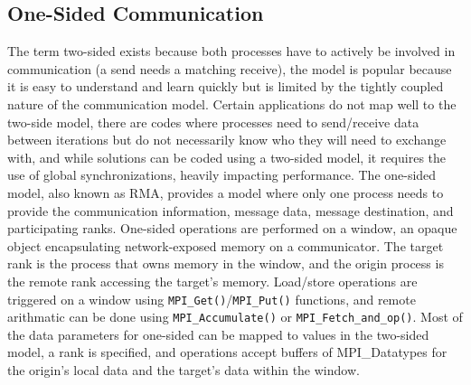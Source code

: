 \subsection{One-Sided Communication}
The term two-sided exists because both processes have to actively be involved in communication (a send needs a matching receive), the model is popular because it is easy to understand and learn quickly but is limited by the tightly coupled nature of the communication model.
Certain applications do not map well to the two-side model, there are codes where processes need to send/receive data between iterations but do not necessarily know who they will need to exchange with, and while solutions can be coded using a two-sided model, it requires the use of global synchronizations, heavily impacting performance.
The one-sided model, also known as \gls{RMA}, provides a model where only one process needs to provide the communication information, message data, message destination, and participating ranks.
One-sided operations are performed on a window, an opaque object encapsulating network-exposed memory on a communicator.
The target rank is the process that owns memory in the window, and the origin process is the remote rank accessing the target's memory.
Load/store operations are triggered on a window using \texttt{MPI\_Get()}/\texttt{MPI\_Put()} functions, and remote arithmatic can be done using \texttt{MPI\_Accumulate()} or \texttt{MPI\_Fetch\_and\_op()}.
Most of the data parameters for one-sided can be mapped to values in the two-sided model, a rank is specified, and operations accept buffers of MPI\_Datatypes for the origin's local data and the target's data within the window.

